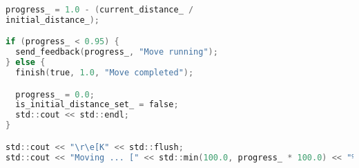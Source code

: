 \noindent\begin{lstlisting}[language=C, style=CStyle, caption={Sends feedback until the goal is reached}]
progress_ = 1.0 - (current_distance_ /
initial_distance_);

if (progress_ < 0.95) {
  send_feedback(progress_, "Move running");
} else {
  finish(true, 1.0, "Move completed");

  progress_ = 0.0;
  is_initial_distance_set_ = false;
  std::cout << std::endl;
}

std::cout << "\r\e[K" << std::flush;
std::cout << "Moving ... [" << std::min(100.0, progress_ * 100.0) << "%]" << std::flush;
  \end{lstlisting}